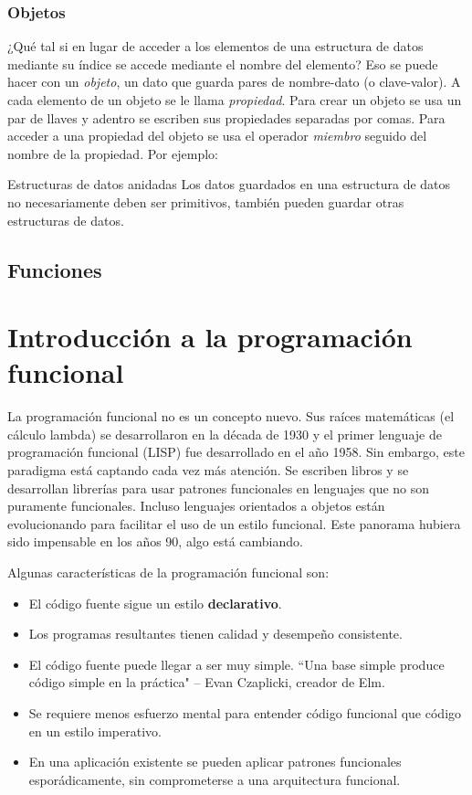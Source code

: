 \documentclass{article}
\newcommand{\codejs}[1]{\tcbox{\lstinline[style=ES6]{#1}}}
\begin{document}
\subsubsection{Objetos}
¿Qué tal si en lugar de acceder a los elementos de una estructura de datos mediante su índice se accede mediante el nombre del elemento? Eso se puede hacer con un \textit{objeto}, un dato que guarda pares de nombre-dato (o clave-valor). A cada elemento de un objeto se le llama \textit{propiedad}. Para crear un objeto se usa un par de llaves \codejs{\{ \}} y adentro se escriben sus propiedades separadas por comas. Para acceder a una propiedad del objeto se usa el operador \textit{miembro} \codejs{.} seguido del nombre de la propiedad. Por ejemplo:

\begin{bclogo}[logo=\bcinfo, couleurBarre=orange, noborder=true, couleur=white]{Estructuras de datos anidadas}
Los datos guardados en una estructura de datos no necesariamente deben ser primitivos, también pueden guardar otras estructuras de datos.
\end{bclogo}


\subsection{Funciones}


\section{Introducción a la programación funcional}
\label{sec:fp-intro}
La programación funcional no es un concepto nuevo. Sus raíces matemáticas (el cálculo lambda) se desarrollaron en la década de 1930 y el primer lenguaje de programación funcional (LISP) fue desarrollado en el año 1958. Sin embargo, este paradigma está captando cada vez más atención. Se escriben libros y se desarrollan librerías para usar patrones funcionales en lenguajes que no son puramente funcionales. Incluso lenguajes orientados a objetos están evolucionando para facilitar el uso de un estilo funcional. Este panorama hubiera sido impensable en los años 90, algo está cambiando.\cite{why-isnt-fp-norm}

Algunas características de la programación funcional son:
\begin{itemize}
  \item El código fuente sigue un estilo \textbf{declarativo}.
  \item Los programas resultantes tienen calidad y desempeño consistente.
  \item El código fuente puede llegar a ser muy simple. ``Una base simple produce código simple en la práctica" \medspace – Evan Czaplicki, creador de Elm\cite{mainstream-elm}.
  \item Se requiere menos esfuerzo mental para entender código funcional que código en un estilo imperativo\cite{skeptics-functional-style}.
  \item En una aplicación existente se pueden aplicar patrones funcionales esporádicamente, sin comprometerse a una arquitectura funcional\cite{skeptics-functional-style}.
\end{itemize}
\end{document}
